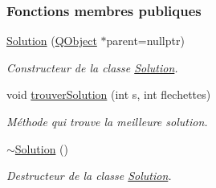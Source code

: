 \subsubsection*{Fonctions membres publiques}
\begin{DoxyCompactItemize}
\item 
\hyperlink{class_solution_a378d4a570c95a6d4c013996fef75c6f0}{Solution} (\hyperlink{class_q_object}{Q\+Object} $\ast$parent=nullptr)
\begin{DoxyCompactList}\small\item\em Constructeur de la classe \hyperlink{class_solution}{Solution}. \end{DoxyCompactList}\item 
void \hyperlink{class_solution_a9ab0b0fd2b557f5abda8bd1a6da641e4}{trouver\+Solution} (int s, int flechettes)
\begin{DoxyCompactList}\small\item\em Méthode qui trouve la meilleure solution. \end{DoxyCompactList}\item 
\hyperlink{class_solution_a5d245f7409aacf6ace5e965b7879a580}{$\sim$\+Solution} ()
\begin{DoxyCompactList}\small\item\em Destructeur de la classe \hyperlink{class_solution}{Solution}. \end{DoxyCompactList}\end{DoxyCompactItemize}
